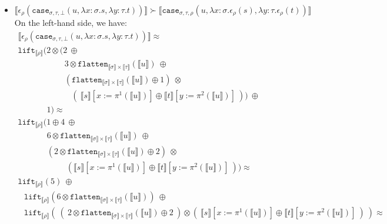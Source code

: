 \documentclass[runningheads,a4paper]{llncs}
\newcommand{\typeinterpret}[1]{\llbracket #1 \rrbracket}
\newcommand{\interpret}[1]{\llbracket #1 \rrbracket}
\newcommand{\abs}[2]{\lambda #1.#2}
\newcommand{\flatten}{\mathtt{flatten}}
\newcommand{\lift}{\mathtt{lift}}
\begin{document}
\begin{itemize}
\item $\interpret{\epsilon_\rho(\mathtt{case}_{\sigma,\tau,\bot}(u,
  \abs{x:\sigma}{s},\abs{y:\tau}{t}))} \succ
  \interpret{\mathtt{case}_{\sigma,\tau,\rho}(u,
  \abs{x:\sigma}{\epsilon_\rho(s)},\abs{y:\tau}{\epsilon_\rho(t)})}$ \\
  On the left-hand side, we have:
  \[
  \begin{array}{l}
  \interpret{\epsilon_\rho(\mathtt{case}_{\sigma,\tau,\bot}(u,
  \abs{x:\sigma}{s},\abs{y:\tau}{t}))} \approx \\
  \lift_{\typeinterpret{\rho}}(2 \otimes (
  2\ \oplus \\
  \phantom{ABCDEFG,}
  3 \otimes \flatten_{\typeinterpret{\sigma} \times
    \typeinterpret{\tau}}(\interpret{u})\ \oplus \\
  \phantom{ABCDEFG,}
  (\flatten_{\typeinterpret{\sigma} \times \typeinterpret{\tau}}(
    \interpret{u}) \oplus 1)\ \otimes  \\
    \phantom{ABCDEFGHI} (\ 
      \interpret{s}[x:=\pi^1(\interpret{u})] \oplus
      \interpret{t}[y:=\pi^2(\interpret{u})]\ )
  )\ \oplus \\
  \phantom{ABCD,} 1) \approx \\
  \lift_{\typeinterpret{\rho}}(
  1 \oplus 4\ \oplus \\
    \phantom{ABCDe}
    6 \otimes \flatten_{\typeinterpret{\sigma} \times
    \typeinterpret{\tau}}(\interpret{u})\ \oplus \\
    \phantom{ABCDe}
  (2 \otimes \flatten_{\typeinterpret{\sigma} \times \typeinterpret{\tau}}(
    \interpret{u}) \oplus 2)\ \otimes \\
    \phantom{ABCDEFG,}\ (
      \interpret{s}[x:=\pi^1(\interpret{u})] \oplus
      \interpret{t}[y:=\pi^2(\interpret{u})]\ )) \approx \\
  \lift_{\typeinterpret{\rho}}(5)\ \oplus \\
  \phantom{A}
    \lift_{\typeinterpret{\rho}}(6 \otimes
      \flatten_{\typeinterpret{\sigma} \times
      \typeinterpret{\tau}}(\interpret{u}))\ \oplus \\
  \phantom{A}
    \lift_{\typeinterpret{\rho}}(\ 
      (\ 2 \otimes \flatten_{\typeinterpret{\sigma} \times
      \typeinterpret{\tau}}(\interpret{u}) \oplus 2\ ) \otimes
      (\ \interpret{s}[x:=\pi^1(\interpret{u})] \oplus
      \interpret{t}[y:=\pi^2(\interpret{u})]\ )\ ) \approx
  \end{array}
  \]


\end{itemize}
\end{document}

